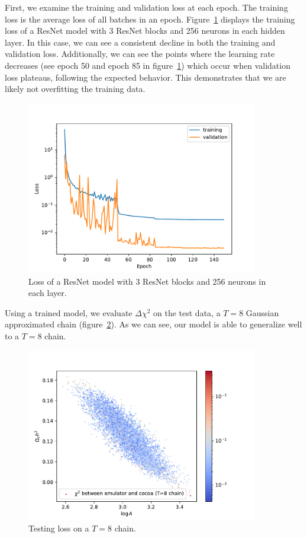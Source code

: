 First, we examine the training and validation loss at each epoch. The training loss is the average loss of all batches in an epoch. Figure~\ref{fig:train_loss_resnet} displays the training loss of a ResNet model with 3 ResNet blocks and 256 neurons in each hidden layer. In this case, we can see a consistent decline in both the training and validation loss. Additionally, we can see the points where the learning rate decreases (see epoch 50 and epoch 85 in figure~\ref{fig:train_loss_resnet}) which occur when validation loss plateaus, following the expected behavior. This demonstrates that we are likely not overfitting the training data.
\begin{figure}[tb]
	\centering
	\includegraphics[width=0.9\textwidth]{plots/losses_resnet_3_256.pdf}
	\caption{Loss of a ResNet model with 3 ResNet blocks and 256 neurons in each layer.}
	\label{fig:train_loss_resnet}
\end{figure}
Using a trained model, we evaluate $\Delta\chi^2$ on the test data, a $T=8$ Gaussian approximated chain (figure~\ref{fig:testing_loss}). As we can see, our model is able to generalize well to a $T=8$ chain. 
\begin{figure}[tb]
	\centering
	\includegraphics[width=0.9\textwidth]{plots/cosmic_shear_resnet_nlayer_3_intdim_256.pdf}
	\caption{Testing loss on a $T=8$ chain.}
	\label{fig:testing_loss}
\end{figure}

